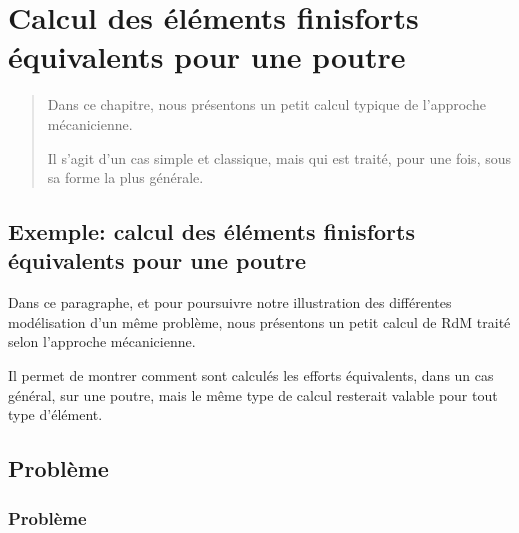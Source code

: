 \ifVersionAvecExemplesSepares
  \chapter{Calcul des éléments finisforts équivalents pour une poutre}
  \begin{abstract}
  Dans ce chapitre, nous présentons un petit calcul typique de l'approche mécanicienne.

  Il s'agit d'un cas simple et classique, mais qui est traité, pour une fois, sous sa forme la
  plus générale.
  \end{abstract}
\else
  \section{Exemple: calcul des éléments finisforts équivalents pour une poutre}

  Dans ce paragraphe, et pour poursuivre notre illustration des différentes modélisation d'un même problème, nous présentons 
  un petit calcul de RdM traité selon l'approche mécanicienne.

  Il permet de montrer comment sont calculés les efforts équivalents, dans un cas général, sur une poutre, mais le
  même type de calcul resterait valable pour tout type d'élément.
\fi

\medskip
\ifVersionAvecExemplesSepares
  \section{Problème}
\else
  \subsection{Problème}
\fi

